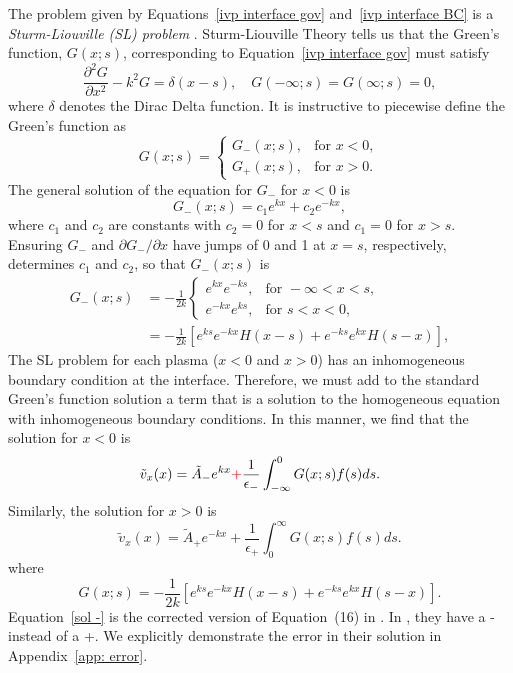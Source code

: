 \documentclass[12pt]{../style-files/ociamthesis}
\begin{document}
The problem given by Equations~\eqref{ivp interface gov} and~\eqref{ivp interface BC} is a \textit{Sturm-Liouville (SL) problem} \citep{boy_etal12}. Sturm-Liouville Theory tells us that the Green's function, $G(x; s)$, corresponding to Equation~\eqref{ivp interface gov} must satisfy 
\begin{equation}
\frac{\partial^2G}{\partial x^2} - k^2 G = \delta(x-s), \quad G(-\infty; s) = G(\infty; s) = 0,
\end{equation}
where $\delta$ denotes the Dirac Delta function. It is instructive to piecewise define the Green's function as
\begin{equation}
G(x; s) = 
\begin{cases}
G_-(x; s), & \text{for } x < 0, \\
G_+(x; s), & \text{for } x > 0.
\end{cases}
\end{equation}
The general solution of the equation for $G_-$ for $x < 0$ is
\begin{equation}
G_-(x; s) = c_1e^{kx} + c_2e^{-kx},
\end{equation}
where $c_1$ and $c_2$ are constants with $c_2 = 0$ for $x < s$ and $c_1 = 0$ for $x > s$. Ensuring $G_-$ and $\partial G_- / \partial x$ have jumps of 0 and 1 at $x = s$, respectively, determines $c_1$ and $c_2$, so that $G_-(x;s)$ is
\begin{equation}
\begin{aligned}
G_-(x; s) & = -\frac{1}{2k} 
\begin{cases}
e^{kx}e^{-ks}, & \text{for } -\infty < x < s, \\
e^{-kx}e^{ks}, & \text{for } s< x < 0,
\end{cases} \\
& = - \frac{1}{2k}[e^{ks}e^{-kx}H(x-s) + e^{-ks}e^{kx}H(s-x)],
\end{aligned}
\end{equation}
The SL problem for each plasma ($x < 0$ and $x > 0$) has an inhomogeneous boundary condition at the interface. Therefore, we must add to the standard Green's function solution a term that is a solution to the homogeneous equation with inhomogeneous boundary conditions. In this manner, we find that the solution for $x < 0$ is
\begin{equation}
\tilde{v}_x(x) = \tilde{A}_-e^{kx} \textcolor{red}{+} \frac{1}{\epsilon_-}\int_{-\infty}^{0} G(x; s) f(s) ds. \label{sol -}
\end{equation}
Similarly, the solution for $x > 0$ is
\begin{equation}
\tilde{v}_x(x) = \tilde{A}_+e^{-kx} + \frac{1}{\epsilon_+}\int_{0}^{\infty} G(x; s) f(s) ds. \label{sol +}
\end{equation}
where
\begin{equation}
G(x; s) = - \frac{1}{2k}[e^{ks}e^{-kx}H(x-s) + e^{-ks}e^{kx}H(s-x)].
\end{equation}
Equation~\eqref{sol -} is the corrected version of Equation~(16) in \cite{rae_etal81}. In \cite{rae_etal81}, they have a - instead of a +. We explicitly demonstrate the error in their solution in Appendix~\ref{app: error}.
\end{document}

